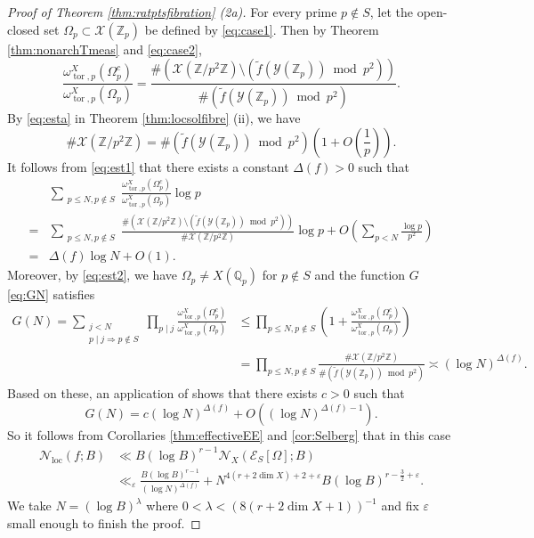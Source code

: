 \documentclass[11pt,letterpaper]{amsart}
\newcommand{\BQ}{{\mathbb {Q}}}
\newcommand{\BZ}{{\mathbb {Z}}}
\newcommand{\CE}{{\mathcal {E}}}
\newcommand{\CN}{{\mathcal {N}}}
\newcommand{\CX}{{\mathcal {X}}}
\newcommand{\CY}{{\mathcal {Y}}}
\theoremstyle{plain}
\numberwithin{equation}{section}
\theoremstyle{definition}
\theoremstyle{remark}
\begin{document}
\begin{proof}[Proof of Theorem \ref{thm:ratptsfibration} (2a)]
For every prime $p\notin S$, let the open-closed set $\Omega_p\subset\CX(\BZ_p)$ be defined by \eqref{eq:case1}. Then by Theorem \ref{thm:nonarchTmeas} and \eqref{eq:case2},
$$\frac{\omega_{\operatorname{tor},p}^X(\Omega_p^c)}{\omega_{\operatorname{tor},p}^X(\Omega_p)} =\frac{\#\left(\CX(\BZ/p^2\BZ)\setminus\left(\widetilde{f}(\CY(\BZ_p))\bmod p^2\right)\right)}{\#\left(\widetilde{f}(\CY(\BZ_p))\bmod p^2\right)}.$$
By \eqref{eq:esta} in Theorem \ref{thm:locsolfibre} (ii), we have  $$\#\CX(\BZ/p^2\BZ)=\#\left(\widetilde{f}(\CY(\BZ_p))\bmod p^2\right)\left(1+O\left(\frac{1}{p}\right)\right).$$
It follows from \eqref{eq:est1} that there exists a constant $\varDelta(f)>0$ such that  \begin{align*}
	&\sum_{\substack{p\leqslant N,p\not\in S}}\frac{\omega_{\operatorname{tor},p}^X(\Omega_p^c)}{\omega_{\operatorname{tor},p}^X(\Omega_p)}\log p\\ =&\sum_{\substack{p\leqslant N,p\not\in S}}\frac{\#\left(\CX(\BZ/p^2\BZ)\setminus\left(\widetilde{f}(\CY(\BZ_p))\bmod p^2\right)\right)}{\#\CX(\BZ/p^2\BZ)} \log p +O\left(\sum_{p<N}\frac{\log p}{p^2}\right)\\= &\varDelta(f)\log N+O(1).
\end{align*} 
Moreover, by \eqref{eq:est2}, we have $\Omega_{p}\neq X(\BQ_{p})$ for $p\notin S$ and  the function $G$ \eqref{eq:GN} satisfies
\begin{align*}
	G(N)=\sum_{\substack{j<N\\ p\mid j\Rightarrow p\not\in S}}\prod_{p\mid j}\frac{\omega_{\operatorname{tor},p}^X(\Omega_p^c)}{\omega_{\operatorname{tor},p}^X(\Omega_p)}&\leqslant\prod_{p\leqslant N,p\not\in S}\left(1+\frac{\omega_{\operatorname{tor},p}^X(\Omega_p^c)}{\omega_{\operatorname{tor},p}^X(\Omega_p)}\right)\\ &=\prod_{p\leqslant N,p\not\in S}\frac{\#\CX(\BZ/p^2\BZ)}{\#\left(\widetilde{f}(\CY(\BZ_p))\bmod p^2\right)}\asymp (\log N)^{\varDelta(f)}.
\end{align*}
Based on these, an application of \cite[Theorem 1.1]{I-K} shows that there exists $c>0$ such that
$$G(N)=c(\log N)^{\varDelta(f)}+O\left((\log N)^{\varDelta(f)-1}\right).$$ So it follows from Corollaries \ref{thm:effectiveEE} and \ref{cor:Selberg} that in this case 
\begin{align*}
	\CN_{\operatorname{loc}}(f;B)&\ll B(\log B)^{r-1}\CN_X(\CE_S[\Omega];B)\\ &\ll_\varepsilon \frac{B(\log B)^{r-1}}{(\log N)^{\varDelta(f)}}+N^{4(r+2\dim X)+2+\varepsilon}B(\log B)^{r-\frac{3}{2}+\varepsilon}.\end{align*}
We take $N=(\log B)^\lambda$ where $0<\lambda<(8(r+2\dim X+1))^{-1}$ and fix $\varepsilon$ small enough to finish the proof. 
\end{proof}
\end{document}

